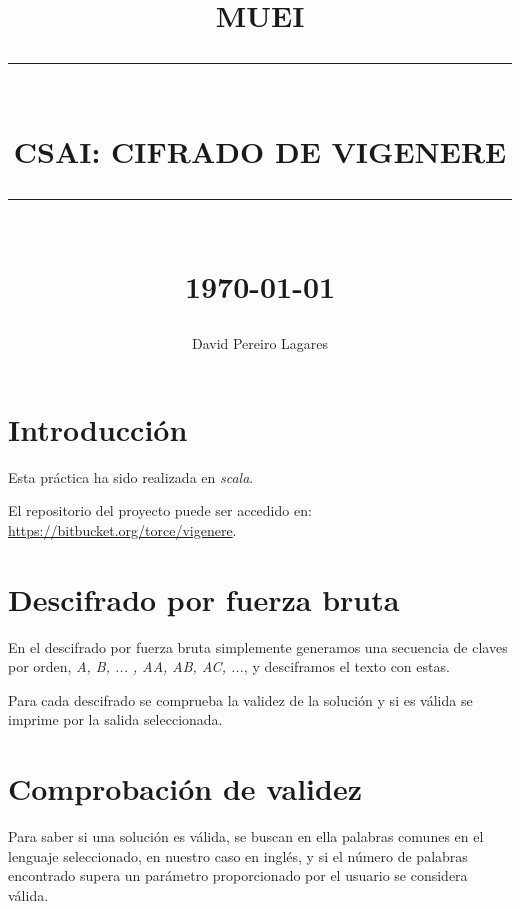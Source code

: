 \documentclass[12pt]{report}
\newcommand{\HRule}[1]{\rule{\linewidth}{#1}}
\begin{document}
\title{ \normalsize \textsc{MUEI}
        \\ [2.0cm]
        \HRule{0.5pt} \\
        \LARGE \textbf{\uppercase{CSAI: Cifrado de Vigenere}}
        \HRule{2pt} \\ [0.5cm]
        \normalsize \today \vspace*{5\baselineskip}}

\date{}

\author{David Pereiro Lagares}

\maketitle
\tableofcontents
\newpage

\sectionfont{\scshape}

\section{Introducción}
Esta práctica ha sido realizada en \textit{scala}. 

El repositorio del proyecto puede ser accedido en: \url{https://bitbucket.org/torce/vigenere}.

\section{Descifrado por fuerza bruta}
En el descifrado por fuerza bruta simplemente generamos una secuencia de claves por orden, 
 \textit{A, B, ... , AA, AB, AC, ...}, y desciframos el texto con estas.
 
Para cada descifrado se comprueba la validez de la solución y si es válida se imprime por la 
salida seleccionada.

\section{Comprobación de validez}
\label{validate}
Para saber si una solución es válida, se buscan en ella palabras comunes en el lenguaje seleccionado,
en nuestro caso en inglés, y si el número de palabras encontrado supera un parámetro proporcionado por 
el usuario se considera válida.
\end{document}
